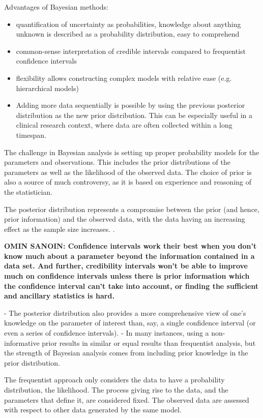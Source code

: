 Advantages of Bayesian methods:
\begin{itemize}
  \item
  quantification of uncertainty as probabilities, knowledge about anything
  unknown is described as a probability distribution, easy to comprehend
  \item
  common-sense interpretation of credible intervals compared to frequentist
  confidence intervals
  \item
  flexibility allows constructing complex models with relative ease (e.g.
  hierarchical models)
  \item
  Adding more data sequentially is possible by using the previous posterior
  distribution as the new prior distribution. This can be especially useful in
  a clinical research context, where data are often collected within a long
  timespan.
\end{itemize}
The challenge in Bayesian analysis is setting up proper probability models for
the parameters and observations. \citep{Gelman2013} This includes the prior
distributions of the parameters as well as the likelihood of the observed data.
The choice of prior is also a source of much controversy, as it is based
on experience and reasoning of the statistician.

The posterior distribution represents a compromise between the prior (and
hence, prior information) and the observed data, with the data having an
increasing effect as the sample size increases. \citep{Gelman2013}.

\textbf{OMIN SANOIN: Confidence intervals work their best when you don't know much about a
parameter beyond the information contained in a data set. And further,
credibility intervals won't be able to improve much on confidence intervals
unless there is prior information which the confidence interval can't take
into account, or finding the sufficient and ancillary statistics is hard.}

- The posterior distribution also provides a more comprehensive view of
one's knowledge on the parameter of interest than, say, a single confidence
interval (or even a series of confidence intervals).
- In many instances, using a non-informative prior results in similar or
equal results than frequentist analysis, but the strength of Bayesian
analysis comes from including prior knowledge in the prior distribution. \citep{Jaynes?}

The frequentist approach only considers the data to have a probability
distribution, the likelihood. The process giving rise to the data, and the
parameters that define it, are considered fixed. The observed data are
assessed with respect to other data generated by the same model.




